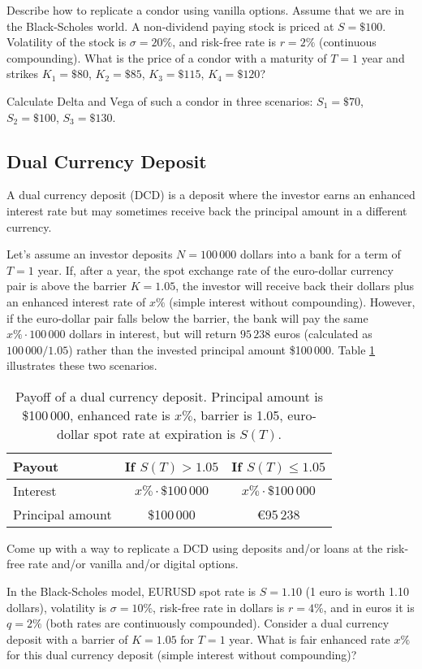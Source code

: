 \documentclass[a4paper,14pt]{extarticle}
\begin{document}
Describe how to replicate a condor using vanilla options. Assume that we are in the Black-Scholes world. A non-dividend paying stock is priced at $S=\$100$. Volatility of the stock is $\sigma=20\%$, and risk-free rate is $r=2\%$ (continuous compounding). What is the price of a condor with a maturity of $T=1$ year and strikes $K_1=\$80$, $K_2=\$85$, $K_3=\$115$, $K_4=\$120$?

Calculate Delta and Vega of such a condor in three scenarios: $S_1=\$70$, $S_2=\$100$, $S_3=\$130$.

\subsection{Dual Currency Deposit}

A dual currency deposit (DCD) is a deposit where the investor earns an enhanced interest rate but may sometimes receive back the principal amount in a different currency.

Let's assume an investor deposits $N=100\,000$ dollars into a bank for a term of $T=1$ year. If, after a year, the spot exchange rate of the euro-dollar currency pair is above the barrier $K=1.05$, the investor will receive back their dollars plus an enhanced interest rate of $x\%$ (simple interest without compounding). However, if the euro-dollar pair falls below the barrier, the bank will pay the same $x\%\cdot 100\,000$ dollars in interest, but will return $95\,238$ euros (calculated as $100\,000/1.05$) rather than the invested principal amount \$100\,000. Table \ref{dcd_payoff} illustrates these two scenarios.

\begin{table}[h]
\centering
\begin{tabular}{l|c|c}
Payout & If $S(T) > 1.05$ & If $S(T) \le 1.05$ \\ \hline
Interest & $x\% \cdot \$100\,000$ & $x\% \cdot \$100\,000$ \\
Principal amount & \$100\,000 & \euro95\,238
\end{tabular}
\caption{Payoff of a dual currency deposit. Principal amount is \$100\,000, enhanced rate is $x\%$, barrier is 1.05, euro-dollar spot rate at expiration is $S(T)$.}
\label{dcd_payoff}
\end{table}

Come up with a way to replicate a DCD using deposits and/or loans at the risk-free rate and/or vanilla and/or digital options.

In the Black-Scholes model, EURUSD spot rate is $S=1.10$ (1 euro is worth 1.10 dollars), volatility is $\sigma=10\%$, risk-free rate in dollars is $r=4\%$, and in euros it is $q=2\%$ (both rates are continuously compounded). Consider a dual currency deposit with a barrier of $K=1.05$ for $T=1$ year. What is fair enhanced rate $x\%$ for this dual currency deposit (simple interest without compounding)?
\end{document}
